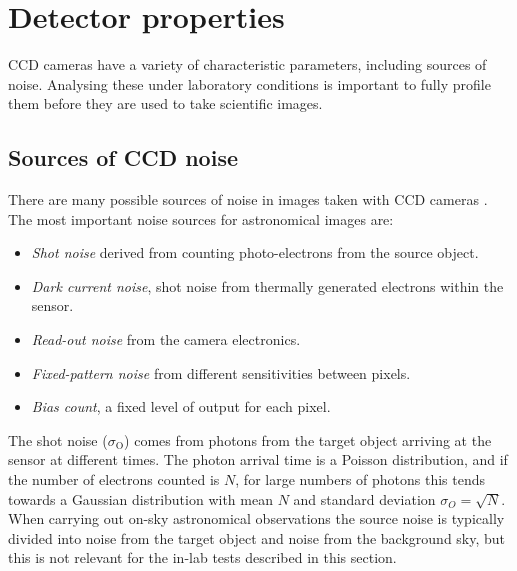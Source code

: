 \section{Detector properties}
\label{sec:detectors}
\begin{colsection}


\begin{colsection}

CCD cameras have a variety of characteristic parameters, including sources of noise. Analysing these under laboratory conditions is important to fully profile them before they are used to take scientific images.

\end{colsection}

\subsection{Sources of CCD noise}
\label{sec:noise}
\begin{colsection}

There are many possible sources of noise in images taken with CCD cameras \citep{CCDs}. The most important noise sources for astronomical images are:

\begin{itemize}
    \item \emph{Shot noise} derived from counting photo-electrons from the source object.
    \item \emph{Dark current noise}, shot noise from thermally generated electrons within the sensor.
    \item \emph{Read-out noise} from the camera electronics.
    \item \emph{Fixed-pattern noise} from different sensitivities between pixels.
    \item \emph{Bias count}, a fixed level of output for each pixel.
\end{itemize}

The shot noise ($\sigma_\text{O}$) comes from photons from the target object arriving at the sensor at different times. The photon arrival time is a Poisson distribution, and if the number of electrons counted is $N$, for large numbers of photons this tends towards a Gaussian distribution with mean $N$ and standard deviation $\sigma_O = \sqrt{N}$. When carrying out on-sky astronomical observations the source noise is typically divided into noise from the target object and noise from the background sky, but this is not relevant for the in-lab tests described in this section.


\end{colsection}
\end{colsection}
